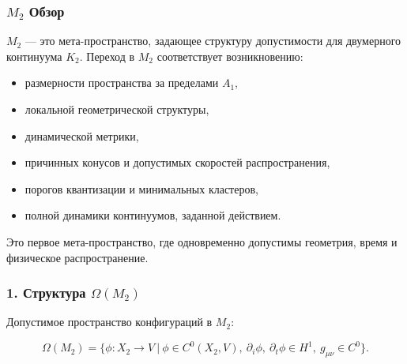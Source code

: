 

\subsubsection{\texorpdfstring{$M_2$}{M_2} Обзор}
\label{sec:m2-overview}

$M_2$ — это мета-пространство, задающее структуру допустимости для
двумерного континуума $K_2$.
Переход в $M_2$ соответствует возникновению:

\begin{itemize}
    \item размерности пространства за пределами $A_1$,
    \item локальной геометрической структуры,
    \item динамической метрики,
    \item причинных конусов и допустимых скоростей распространения,
    \item порогов квантизации и минимальных кластеров,
    \item полной динамики континуумов, заданной действием.
\end{itemize}

Это первое мета-пространство, где одновременно допустимы
геометрия, время и физическое распространение.

\subsubsection*{1. Структура \texorpdfstring{$\Omega(M_2)$}{\Omega(M_2)}}

Допустимое пространство конфигураций в $M_2$:

\[
\Omega(M_2)
=
\Big\{
\phi : X_2 \to V \ \big|\
\phi \in C^{0}(X_2,V),\
\partial_i\phi,\ \partial_t\phi \in H^1,\
 g_{\mu\nu} \in C^{0}
\Big\}.
\]

